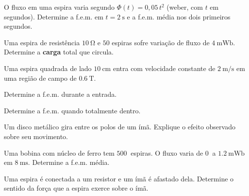 \begin{questao}[2]{}

O fluxo em uma espira varia segundo $\Phi(t)=0{,}05\,t^{2}$ (weber, com $t$ em
segundos). Determine a f.e.m. em $t=\SI{2}{\second}$ e a f.e.m. média nos dois
primeiros segundos.


\end{questao}
\begin{questao}[2]{}

Uma espira de resistência $\SI{10}{\ohm}$ e $50$ espiras sofre variação de
fluxo de $\SI{4}{\milli\weber}$. Determine a \textbf{carga} total que circula.


\end{questao}
\begin{questao}[2]{}

Uma espira quadrada de lado $\SI{10}{\centi\meter}$ entra com velocidade
constante de $\SI{2}{\meter\per\second}$ em uma região de campo de
$\SI{0.6}{\tesla}$.
\begin{itensq}
\item Determine a f.e.m. durante a entrada.
\item Determine a f.e.m. quando totalmente dentro.
\end{itensq}


\end{questao}
\begin{questao}[2]{}

Um disco metálico gira entre os polos de um ímã. Explique o efeito observado
sobre seu movimento.


\end{questao}
\begin{questao}[2]{}

Uma bobina com núcleo de ferro tem $\SI{500}{}$ espiras. O fluxo varia de
$\SI{0}{}$ a $\SI{1.2}{\milli\weber}$ em $\SI{8}{\milli\second}$. Determine a
f.e.m. média.


\end{questao}
\begin{questao}[2]{}

Uma espira é conectada a um resistor e um ímã é afastado dela. Determine o
sentido da força que a espira exerce sobre o ímã.


\end{questao}
